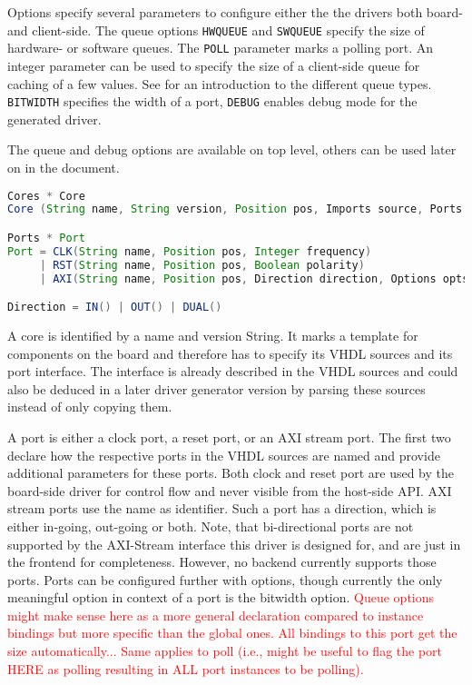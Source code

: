 \documentclass{report}
\begin{document}
Options specify several parameters to configure either the the drivers both board- and client-side. The queue options \texttt{HWQUEUE} and \texttt{SWQUEUE} specify the size of hardware- or software queues. The \texttt{POLL} parameter marks a polling port. An integer parameter can be used to specify the size of a client-side queue for caching of a few values. See  for an introduction to the different queue types.
\texttt{BITWIDTH} specifies the width of a port, \texttt{DEBUG} enables debug mode for the generated driver.

The queue and debug options are available on top level, others can be used later on in the document.

\begin{lstlisting}[language=java, breaklines=true]
Cores * Core
Core (String name, String version, Position pos, Imports source, Ports ports)

Ports * Port
Port = CLK(String name, Position pos, Integer frequency)
     | RST(String name, Position pos, Boolean polarity)
     | AXI(String name, Position pos, Direction direction, Options opts)

Direction = IN() | OUT() | DUAL()
\end{lstlisting}

A core is identified by a name and version String. It marks a template for components on the board and therefore has to specify its VHDL sources and its port interface. The interface is already described in the VHDL sources and could also be deduced in a later driver generator version by parsing these sources instead of only copying them.

A port is either a clock port, a reset port, or an AXI stream port. The first two declare how the respective ports in the VHDL sources are named and provide additional parameters for these ports. Both clock and reset port are used by the board-side driver for control flow and never visible from the host-side API.
AXI stream ports use the name as identifier. Such a port has a direction, which is either in-going, out-going or both. Note, that bi-directional ports are not supported by the AXI-Stream interface this driver is designed for, and are just in the frontend for completeness. However, no backend currently supports those ports.
Ports can be configured further with options, though currently the only meaningful option in context of a port is the bitwidth option. \textcolor{red}{Queue options might make sense here as a more general declaration compared to instance bindings but more specific than the global ones. All bindings to this port get the size automatically... Same applies to poll (i.e., might be useful to flag the port HERE as polling resulting in ALL port instances to be polling).}
\end{document}

